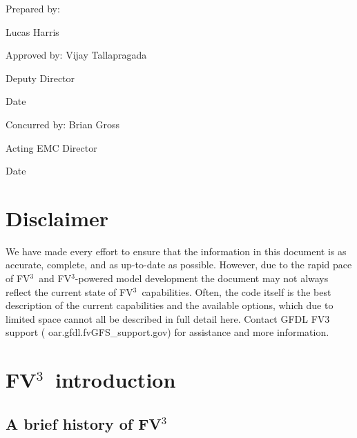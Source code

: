 \documentclass[12pt,letterpaper]{book}
\newcommand{\fv}{FV$^{\mathrm{3}}$}
\begin{document}
\indent \indent \indent Prepared by: 

\indent \indent \indent \indent \indent \indent Lucas Harris

\vspace{9.0\baselineskip} %

\indent \indent Approved by: Vijay Tallapragada  

\indent \indent \indent \indent \indent \indent Deputy Director

\indent \indent \indent \indent \indent \indent Date

\vspace{9.0\baselineskip} %

\indent \indent Concurred by: Brian Gross

\indent \indent \indent \indent \indent \indent Acting EMC Director

\indent \indent \indent \indent \indent \indent Date


\eject
\tableofcontents

\chapter*{Disclaimer}

We have made every effort to ensure that the information in this document is as accurate, complete, and as up-to-date as possible. However, due to the rapid pace of \fv\ and \fv-powered model development the document may not always reflect the current state of \fv\ capabilities. Often, the code itself is the best description of the current capabilities and the available options, which due to limited space cannot all be described in full detail here. Contact GFDL FV3 support ( oar.gfdl.fvGFS\_support\@noaa.gov)  for  assistance and more information. 

\chapter{\fv\ introduction}\label{chap:intro}



\section{A brief history of \fv}
\end{document}

